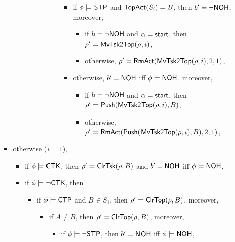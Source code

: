 \begin{itemize}
\begin{itemize}
\begin{itemize}
\begin{itemize}
\begin{itemize}
\begin{itemize}
\begin{itemize}
								\begin{itemize}
									\item if $\phi\models{\sf STP}$ and $\mathsf{TopAct}(S_i) = B$, then $b' = \neg {\sf NOH}$, moreover,
									\begin{itemize}
										\item if $b = \neg {\sf NOH}$ and $\alpha = {\mathsf{start} }$, then $\rho'=\mathsf{MvTsk2Top}(\rho, i)$,
										\item otherwise, $\rho' = \mathsf{RmAct}(\mathsf{MvTsk2Top}(\rho, i), 2, 1)$, 
									\end{itemize}
									\item otherwise, $b' = {\sf NOH}$ iff $\phi \models {\sf NOH}$, moreover, 
									\begin{itemize}
										\item if $b = \neg {\sf NOH}$ and $\alpha = {\mathsf{start} }$, then $\rho'=\mathsf{Push}(\mathsf{MvTsk2Top}(\rho, i), B)$,
										\item otherwise, $\rho' = \mathsf{RmAct}(\mathsf{Push}(\mathsf{MvTsk2Top}(\rho, i), B), 2, 1)$, 
									\end{itemize}
								\end{itemize}
							\end{itemize}
						\end{itemize}
					\end{itemize}
			\end{itemize}
		\item otherwise ($i  = 1$),  
		\begin{itemize}
			\item if $\phi \models {\sf CTK}$, then $\rho' = \mathsf{ClrTsk}(\rho,B)$ and $b' = {\sf NOH}$ iff $\phi \models {\sf NOH}$, 
			\item if $\phi \models \neg {\sf CTK}$, then
			\begin{itemize}
				\item if $\phi \models {\sf CTP}$ and $B \in S_1$, then $\rho'=\mathsf{ClrTop}(\rho, B)$, moreover, 
				\begin{itemize}
            				\item if $A \neq B$, then $\rho'=\mathsf{ClrTop}(\rho, B)$, moreover, 
					\begin{itemize}
						\item if $\phi\models \neg {\sf STP}$, then $b' = {\sf NOH}$ iff $\phi \models {\sf NOH}$, 

\end{itemize}
\end{itemize}
\end{itemize}
\end{itemize}
\end{itemize}
\end{itemize}
\end{itemize}
